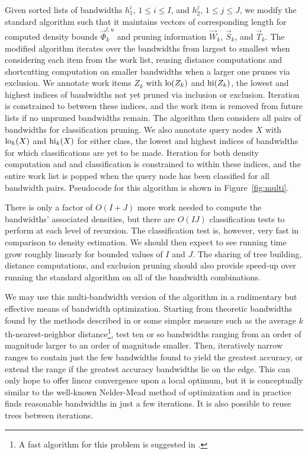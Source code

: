 \documentclass[twoside,leqno,twocolumn]{article}
\newcommand{\lohi}[1]{#1^{l,u}}
\begin{document}
Given sorted lists of bandwidths $h_1^i$, $1 \leq i \leq I$, and
$h_2^j$, $1 \leq j \leq J$, we modify the standard algorithm such that
it maintains vectors of corresponding length for computed density
bounds $\lohi{\vec{\Phi}_k}$ and pruning information $\vec{W}_k$,
$\vec{S}_k$, and $\vec{T}_k$.  The modified algorithm iterates over
the bandwidths from largest to smallest when considering each item
from the work list, reusing distance computations and shortcutting
computation on smaller bandwidths when a larger one prunes via
exclusion.  We annotate work items $Z_k$ with ${\rm lo}(Z_k)$ and
${\rm hi}(Z_k)$, the lowest and highest indices of bandwidths not yet
pruned via inclusion or exclusion.  Iteration is constrained to
between these indices, and the work item is removed from future lists
if no unpruned bandwidths remain.  The algorithm then considers all
pairs of bandwidths for classification pruning. We also annotate query
nodes $X$ with ${\rm lo}_k(X)$ and ${\rm hi}_k(X)$ for either class,
the lowest and highest indices of bandwidths for which classifications
are yet to be made.  Iteration for both density computation and and
classification is constrained to within these indices, and the entire
work list is popped when the query node has been classified for all
bandwidth pairs.  Pseudocode for this algorithm is shown in
Figure~\ref{fig:multi}.

There is only a factor of $O(I + J)$ more work needed to compute the
bandwidths' associated densities, but there are $O(IJ)$ classification
tests to perform at each level of recursion.  The classification test
is, however, very fast in comparison to density estimation.  We should
then expect to see running time grow roughly linearly for bounded
values of $I$ and $J$.  The sharing of tree building, distance
computations, and exclusion pruning should also provide speed-up over
running the standard algorithm on all of the bandwidth combinations.

We may use this multi-bandwidth version of the algorithm in a
rudimentary but effective means of bandwidth optimization.  Starting
from theoretic bandwidths found by the methods described in
\cite{silverman86} or some simpler measure such as the average
$k$th-nearest-neighbor distance\footnote{A fast algorithm for this
problem is suggested in \cite{nips2000paper}.}, test ten or so
bandwidths ranging from an order of magnitude larger to an order of
magnitude smaller.  Then, iteratively narrow ranges to contain just
the few bandwidths found to yield the greatest accuracy, or extend the
range if the greatest accuracy bandwidths lie on the edge.  This can
only hope to offer linear convergence upon a local optimum, but it is
conceptually similar to the well-known Nelder-Mead method of
optimization and in practice finds reasonable bandwidths in just a few
iterations.  It is also possible to reuse trees between iterations.
\end{document}
